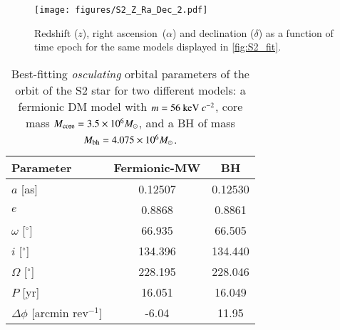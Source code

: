 \documentclass[twocolumn]{aa}
\begin{document}
\begin{figure}
   \texttt{[image: figures/S2\_Z\_Ra\_Dec\_2.pdf]}
   \caption{Redshift ($z$), right ascension~($\alpha$) and declination ($\delta$) as a function of time epoch for the same models
   displayed in \cref{fig:S2_fit}.}
   \label{fig:S2_fit_b}
\end{figure}

\begin{table}[t]
\caption{Best-fitting \textit{osculating} orbital parameters of the orbit of the S2 star for two different models: a fermionic DM model with $m=56~{\rm keV}~c^{-2}$, core mass $M_{\rm{core}}=3.5\times 10^6 M_\odot$, and a BH of mass  $M_{\rm bh}=4.075\times 10^6 M_\odot$.}
\centering
\begin{tabular}{lcc}
\hline
Parameter & Fermionic-MW & BH \\
\hline 
$a$ [as] & 0.12507 & 0.12530 \\
$e$ & 0.8868 & 0.8861 \\
$\omega$ [$^{\circ}$] & 66.935 & 66.505 \\
$i$ [$^{\circ}$] & 134.396 & 134.440 \\
$\Omega$ [$^{\circ}$] & 228.195 & 228.046 \\
$P$ [yr] & 16.051 & 16.049 \\
$\Delta \phi$ [arcmin rev$^{-1}$] & -6.04 & 11.95 \\
\hline
\end{tabular}
\label{tab:S2}
\end{table}
%
\end{document}
